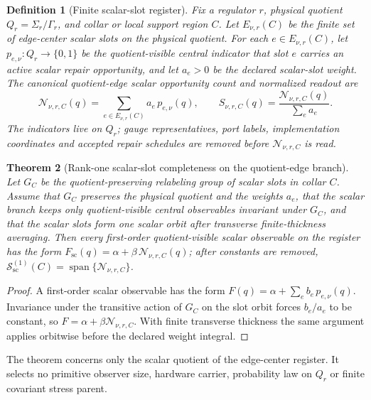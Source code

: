 \documentclass[11pt]{article}
\newtheorem{theorem}{Theorem}[section]
\newtheorem{definition}[theorem]{Definition}
\theoremstyle{remark}
\theoremstyle{plain}
\begin{document}
\begin{definition}[Finite scalar-slot register]\label{def:finite-scalar-slot-register}
Fix a regulator \(r\), physical quotient \(Q_r=\Sigma_r/\Gamma_r\), and collar
or local support region \(C\). Let \(E_{\nu,r}(C)\) be the finite set of
edge-center scalar slots on the physical quotient. For each
\(e\in E_{\nu,r}(C)\), let \(p_{e,\nu}:Q_r\to\{0,1\}\) be the
quotient-visible central indicator that slot \(e\) carries an active scalar
repair opportunity, and let \(a_e>0\) be the declared scalar-slot weight.
The canonical quotient-edge scalar opportunity count and normalized readout
are
\[
\mathcal N_{\nu,r,C}(q)=\sum_{e\in E_{\nu,r}(C)}a_e\,p_{e,\nu}(q),
\qquad
S_{\nu,r,C}(q)=\frac{\mathcal N_{\nu,r,C}(q)}{\sum_{e}a_e}.
\]
The indicators live on \(Q_r\); gauge representatives, port labels,
implementation coordinates and accepted repair schedules are removed before
\(\mathcal N_{\nu,r,C}\) is read.
\end{definition}

\begin{theorem}[Rank-one scalar-slot completeness on the quotient-edge branch]
\label{thm:scalar-slot-completeness}
Let \(G_C\) be the quotient-preserving relabeling group of scalar slots in
collar \(C\). Assume that \(G_C\) preserves the physical quotient and the
weights \(a_e\), that the scalar branch keeps only quotient-visible central
observables invariant under \(G_C\), and that the scalar slots form one
scalar orbit after transverse finite-thickness averaging. Then every
first-order quotient-visible scalar observable on the register has the form
\(F_{\mathrm{sc}}(q)=\alpha+\beta\,\mathcal N_{\nu,r,C}(q)\); after constants
are removed,
\(\mathcal S^{(1)}_{\mathrm{sc}}(C)=\operatorname{span}\{\mathcal N_{\nu,r,C}\}\).
\end{theorem}

\begin{proof}
A first-order scalar observable has the form
\(F(q)=\alpha+\sum_eb_e\,p_{e,\nu}(q)\). Invariance under the transitive
action of \(G_C\) on the slot orbit forces \(b_e/a_e\) to be constant, so
\(F=\alpha+\beta\mathcal N_{\nu,r,C}\). With finite transverse thickness the
same argument applies orbitwise before the declared weight integral.
\end{proof}

The theorem concerns only the scalar quotient of the edge-center register. It
selects no primitive observer size, hardware carrier, probability law on
\(Q_r\) or finite covariant stress parent.
\end{document}
